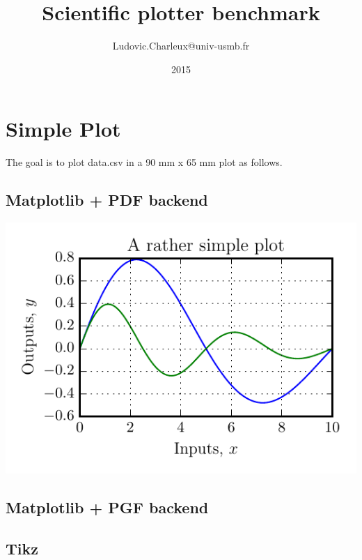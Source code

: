 \documentclass[10pt,a4paper,oneside,onecolumn]{article}
\author{Ludovic.Charleux@univ-usmb.fr}
\title{Scientific plotter benchmark}
\date{2015}
\begin{document}
\maketitle
\tableofcontents
\newpage

\section{Simple Plot}

The goal is to plot data.csv in a 90 mm x 65 mm plot as follows.

\subsection{Matplotlib + PDF backend}
\begin{center}
\includegraphics{simple_plot/mpl.pdf}
\end{center}

\subsection{Matplotlib + PGF backend}
\begin{center}

\end{center}

\subsection{Tikz}
\begin{center}

\end{center}
\end{document}
